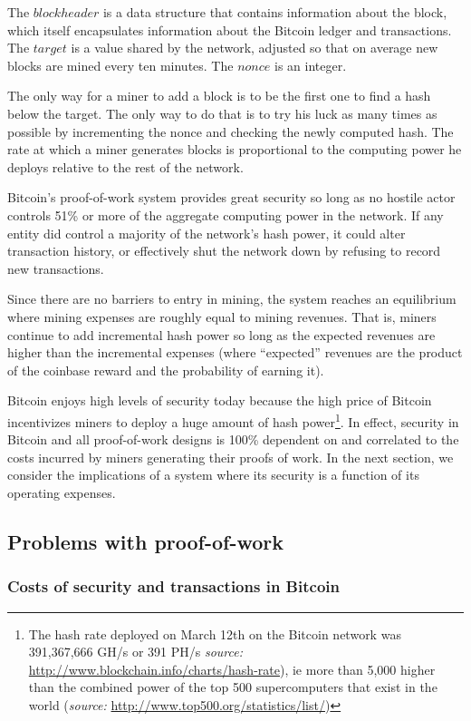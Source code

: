 \documentclass[a4paper,11pt]{article}
\begin{document}
The $blockheader$ is a data structure that contains information about the block, which itself encapsulates information about the Bitcoin ledger and transactions. The $target$ is a value shared by the network, adjusted so that on average new blocks are mined every ten minutes. The $nonce$ is an integer. 

The only way for a miner to add a block is to be the first one to find a hash below the target. The only way to do that is to try his luck as many times as possible by incrementing the nonce and checking the newly computed hash. The rate at which a miner generates blocks is proportional to the computing power he deploys relative to the rest of the network. 

Bitcoin's proof-of-work system provides great security so long as no hostile actor controls 51\% or more of the aggregate computing power in the network. If any entity did control a majority of the network's hash power, it could alter transaction history, or effectively shut the network down by refusing to record new transactions. 

Since there are no barriers to entry in mining, the system reaches an equilibrium where mining expenses are roughly equal to mining revenues. That is, miners continue to add incremental hash power so long as the expected revenues are higher than the incremental expenses (where ``expected'' revenues are the product of the coinbase reward and the probability of earning it).

Bitcoin enjoys high levels of security today because the high price of Bitcoin incentivizes miners to deploy a huge amount of hash power\footnote{The hash rate deployed on March 12th on the Bitcoin network was 391,367,666 GH/s or 391 PH/s \textit{source:} \url{http://www.blockchain.info/charts/hash-rate}), ie more than 5,000 higher than the combined power of the top 500 supercomputers that exist in the world (\textit{source:} \url{http://www.top500.org/statistics/list/})}. In effect, security in Bitcoin and all proof-of-work designs is 100\% dependent on and correlated to the costs incurred by miners generating their proofs of work. 
In the next section, we consider the implications of a system where its security is a function of its operating expenses. 

\subsection{Problems with proof-of-work}
\subsubsection{Costs of security and transactions in Bitcoin}
\end{document}
